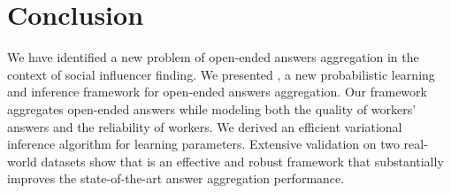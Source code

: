 \section{Conclusion}

We have identified a new problem of open-ended answers aggregation in the context of social influencer finding. We presented \sys, a new probabilistic learning and inference framework for open-ended answers aggregation. Our framework aggregates open-ended answers while modeling both the quality of workers' answers and the reliability of workers. We derived an efficient variational inference algorithm for learning \sys parameters. Extensive validation on two real-world datasets show that \sys is an effective and robust framework that substantially improves the state-of-the-art answer aggregation performance.